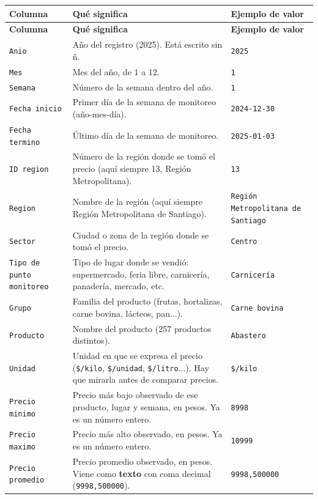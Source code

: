 \documentclass[10.5pt]{article}
\newcommand{\hdr}[1]{\textbf{\color{white}#1}}
\begin{document}
\begin{xltabular}{\linewidth}{@{}p{4.5cm} >{\raggedright\arraybackslash}X p{3.4cm}@{}}
\hdr{Columna} & \hdr{Qué significa} & \hdr{Ejemplo de valor} \\
\endfirsthead
{}\hdr{Columna} & \hdr{Qué significa} & \hdr{Ejemplo de valor} \\
\endhead
\texttt{Anio} & Año del registro (2025). Está escrito sin ñ. & \texttt{2025} \\
\texttt{Mes} & Mes del año, de 1 a 12. & \texttt{1} \\
\texttt{Semana} & Número de la semana dentro del año. & \texttt{1} \\
\texttt{Fecha inicio} & Primer día de la semana de monitoreo (año-mes-día). & \texttt{2024-12-30} \\
\texttt{Fecha termino} & Último día de la semana de monitoreo. & \texttt{2025-01-03} \\
\texttt{ID region} & Número de la región donde se tomó el precio (aquí siempre 13, Región Metropolitana). & \texttt{13} \\
\texttt{Region} & Nombre de la región (aquí siempre Región Metropolitana de Santiago). & \texttt{Región Metropolitana de Santiago} \\
\texttt{Sector} & Ciudad o zona de la región donde se tomó el precio. & \texttt{Centro} \\
\texttt{Tipo de punto monitoreo} & Tipo de lugar donde se vendió: supermercado, feria libre, carnicería, panadería, mercado, etc. & \texttt{Carnicería} \\
\texttt{Grupo} & Familia del producto (frutas, hortalizas, carne bovina, lácteos, pan...). & \texttt{Carne bovina} \\
\texttt{Producto} & Nombre del producto (257 productos distintos). & \texttt{Abastero} \\
\texttt{Unidad} & Unidad en que se expresa el precio (\texttt{\$/\allowbreak{}kilo}, \texttt{\$/\allowbreak{}unidad}, \texttt{\$/\allowbreak{}litro}...). Hay que mirarla antes de comparar precios. & \texttt{\$/\allowbreak{}kilo} \\
\texttt{Precio minimo} & Precio más bajo observado de ese producto, lugar y semana, en pesos. Ya es un número entero. & \texttt{8998} \\
\texttt{Precio maximo} & Precio más alto observado, en pesos. Ya es un número entero. & \texttt{10999} \\
\texttt{Precio promedio} & Precio promedio observado, en pesos. Viene como \textbf{texto} con coma decimal (\texttt{9998,500000}). & \texttt{9998,500000} \\
\end{xltabular}
\end{document}
